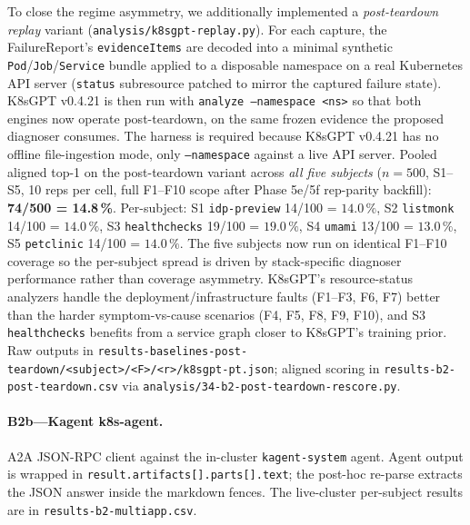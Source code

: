 \documentclass[sigconf, nonacm=true, anonymous=false, review=false]{acmart}
\newcommand{\artifactname}[1]{\nolinkurl{#1}}
\newcommand{\fp}{FailureReport\xspace}
\begin{document}
To close the regime asymmetry, we additionally implemented a
\emph{post-teardown replay} variant
(\texttt{analysis/k8sgpt-replay.py}). For each capture, the
\fp{}'s \texttt{evidenceItems} are decoded into a minimal synthetic
\texttt{Pod}/\texttt{Job}/\texttt{Service} bundle applied to a
disposable namespace on a real Kubernetes API server (\texttt{status}
subresource patched to mirror the captured failure state). K8sGPT
v0.4.21 is then run with \texttt{analyze --namespace <ns>} so that
both engines now operate post-teardown, on the same frozen evidence
the proposed diagnoser consumes. The harness is required because
K8sGPT v0.4.21 has no offline file-ingestion mode, only
\texttt{--namespace} against a live API server. Pooled aligned
top-1 on the post-teardown variant across \emph{all five subjects}
($n=500$, S1--S5, 10 reps per cell, full F1--F10 scope after
Phase 5e/5f rep-parity backfill):
\textbf{74/500 = 14.8\,\%}. Per-subject: S1
\texttt{idp-preview} 14/100 = $14.0\,\%$, S2 \texttt{listmonk}
14/100 = $14.0\,\%$, S3 \texttt{healthchecks} 19/100 = $19.0\,\%$,
S4 \texttt{umami} 13/100 = $13.0\,\%$, S5 \texttt{petclinic}
14/100 = $14.0\,\%$. The five subjects now run on identical
F1--F10 coverage so the per-subject spread is driven by stack-specific
diagnoser performance rather than coverage asymmetry. K8sGPT's
resource-status analyzers handle the deployment/infrastructure
faults (F1--F3, F6, F7) better than the harder symptom-vs-cause
scenarios (F4, F5, F8, F9, F10), and S3 \texttt{healthchecks}
benefits from a service graph closer to K8sGPT's training prior. Raw outputs in
\artifactname{results-baselines-post-teardown/<subject>/<F>/<r>/k8sgpt-pt.json};
aligned scoring in \artifactname{results-b2-post-teardown.csv} via
\artifactname{analysis/34-b2-post-teardown-rescore.py}.

\paragraph{B2b---Kagent k8s-agent.} A2A JSON-RPC client against the
in-cluster \texttt{kagent-system} agent. Agent output is wrapped in
\texttt{result.artifacts[].parts[].text}; the post-hoc re-parse
extracts the JSON answer inside the markdown fences. The live-cluster
per-subject results are in \texttt{results-b2-multiapp.csv}.
\end{document}
